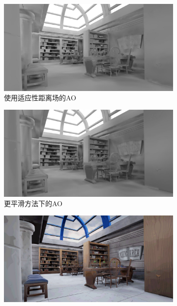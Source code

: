 \begin{figure}
\begin{fullwidth}
	\begin{subfigure}[b]{0.5\thewidth}
		\includegraphics[width=\textwidth]{figures/df/DFAO_View_OldMethod}
		\caption{使用适应性距离场的AO}
	\end{subfigure}
	\begin{subfigure}[b]{0.5\thewidth}
		\includegraphics[width=\textwidth]{figures/df/DFAO_View_NewMethod}
		\caption{更平滑方法下的AO}
	\end{subfigure}
	\begin{subfigure}[b]{0.5\thewidth}
		\includegraphics[width=\textwidth]{figures/df/DFAO_Scene_OldMethod}

\end{subfigure}
\end{fullwidth}
\end{figure}
